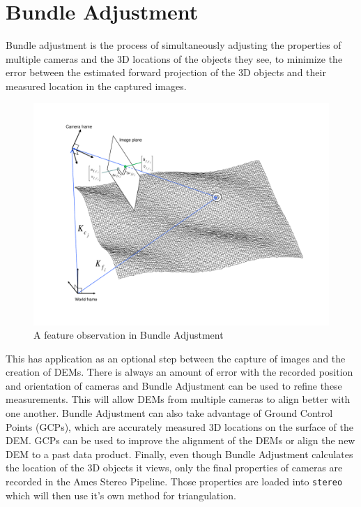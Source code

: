 \chapter{Bundle Adjustment}
\label{ch:bundle_adjustment}

Bundle adjustment is the process of simultaneously adjusting the
properties of multiple cameras and the 3D locations of the objects
they see, to minimize the error between the estimated forward
projection of the 3D objects and their measured location in the captured
images. 

\begin{figure}[htp]
  \begin{center}
  \includegraphics[trim=20mm 20mm 20mm 15mm,clip,width=6in]{images/ba_feature_observation.pdf}
  \end{center}
  \caption{ A feature observation in Bundle Adjustment \citep{moore09} }
  \label{fig:ba_feature}
\end{figure}

This has application as an optional step between the capture
of images and the creation of DEMs. There is always an amount of error
with the recorded position and orientation of cameras and Bundle
Adjustment can be used to refine these measurements. This will allow
DEMs from multiple cameras to align better with one another. Bundle
Adjustment can also take advantage of Ground Control Points (GCPs),
which are accurately measured 3D locations on the surface of the DEM. GCPs
can be used to improve the alignment of the DEMs or align the new DEM
to a past data product. Finally, even though Bundle Adjustment
calculates the location of the 3D objects it views, only the final
properties of cameras are recorded in the Ames Stereo Pipeline. Those
properties are loaded into \texttt{stereo} which will then use it's own
method for triangulation.


